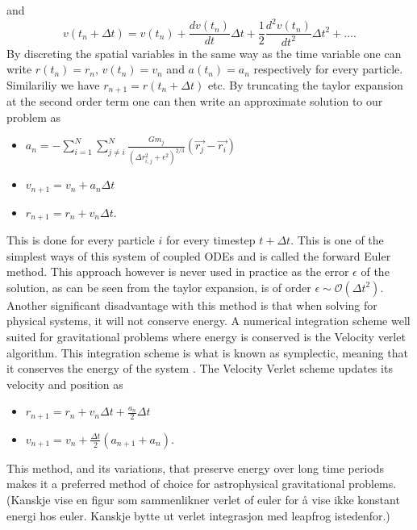 and
\begin{equation}
    v(t_n+\Delta t) = v(t_n) + \frac{dv(t_n)}{dt}\Delta t + \frac{1}{2}\frac{d^2v(t_n)}{dt^2}\Delta t^2 +\ldots.
\end{equation}
By discreting the spatial variables in the same way as the time variable one can
write $r(t_n)=r_n$, $v(t_n)=v_n$ and $a(t_n)=a_n$ respectively for every particle.
Similariliy we have $r_{n+1}=r(t_n + \Delta t)$ etc.
By truncating the taylor expansion at the second order term one can then write
an approximate solution to our problem as
\begin{center}
\begin{itemize}
    \item $a_n=-\sum_{i=1}^{N}\sum_{j\neq i}^N\frac{Gm_j}{(\Delta
    r_{i,j}^2+\epsilon^2)^{2/3}}(\vec{r_j}-\vec{r_i})$
    \item $v_{n+1} = v_n + a_n\Delta t$
    \item $r_{n+1} = r_n + v_n\Delta t.$
\end{itemize}
\end{center}
This is done for every particle $i$ for every timestep $t+\Delta t$. This is one
of the simplest ways of this system of coupled ODEs and is called the forward
Euler method. This approach however is never used in practice as the error $\epsilon$ of
the solution, as can be seen from the taylor expansion, is of order
$\epsilon\sim\mathcal{O}(\Delta t^2)$. Another significant disadvantage with this method is
that when solving for physical systems, it will not conserve energy. A numerical
integration scheme well suited for gravitational problems where energy is
conserved is the Velocity verlet algorithm. This integration scheme is what is
known as symplectic, meaning that it conserves the energy of the system
\cite[p.~31]{holmes2007introduction}. The Velocity Verlet scheme updates its
velocity and position as
\begin{center}
    \begin{itemize}
        \item $r_{n+1} = r_n + v_n\Delta t+\frac{a_n}{2}\Delta t$
        \item $v_{n+1} = v_n + \frac{\Delta t}{2}(a_{n+1}+a_n).$
    \end{itemize}
\end{center}
This method, and its variations, that preserve energy over long time periods
makes it a preferred method of choice for astrophysical gravitational problems.
(Kanskje vise en figur som sammenlikner verlet of euler for å vise ikke konstant
energi hos euler. Kanskje bytte ut verlet integrasjon med leapfrog istedenfor.)
